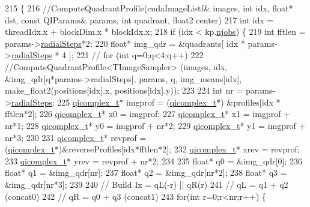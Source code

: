 \begin{DoxyCode}
215 \{
216 \textcolor{comment}{//ComputeQuadrantProfile(cudaImageListf& images, int idx, float* dst, const QIParams& params, int quadrant,
       float2 center)}
217     \textcolor{keywordtype}{int} idx = threadIdx.x + blockDim.x * blockIdx.x;
218     \textcolor{keywordflow}{if} (idx < kp.\hyperlink{struct_base_kernel_params_aec40d44810d0e0a6640c66038af1fbf2}{njobs}) \{
219         \textcolor{keywordtype}{int} fftlen = params->\hyperlink{struct_q_i_params_a19b7d550113364de4e4f11e2c9cfea0e}{radialSteps}*2;
220         \textcolor{keywordtype}{float}* img\_qdr = &quadrants[ idx * params->\hyperlink{struct_q_i_params_a19b7d550113364de4e4f11e2c9cfea0e}{radialSteps} * 4 ];
221     \textcolor{comment}{//  for (int q=0;q<4;q++)}
222             \textcolor{comment}{//ComputeQuadrantProfile<TImageSampler> (images, idx, &img\_qdr[q*params->radialSteps], params,
       q, img\_means[idx], make\_float2(positions[idx].x, positions[idx].y));}
223 
224         \textcolor{keywordtype}{int} nr = params->\hyperlink{struct_q_i_params_a19b7d550113364de4e4f11e2c9cfea0e}{radialSteps};
225         \hyperlink{_q_i_8h_ad57806420787f160bbbe768dbd72d115}{qicomplex\_t}* imgprof = (\hyperlink{_q_i_8h_ad57806420787f160bbbe768dbd72d115}{qicomplex\_t}*) &profiles[idx * fftlen*2];
226         \hyperlink{_q_i_8h_ad57806420787f160bbbe768dbd72d115}{qicomplex\_t}* x0 = imgprof;
227         \hyperlink{_q_i_8h_ad57806420787f160bbbe768dbd72d115}{qicomplex\_t}* x1 = imgprof + nr*1;
228         \hyperlink{_q_i_8h_ad57806420787f160bbbe768dbd72d115}{qicomplex\_t}* y0 = imgprof + nr*2;
229         \hyperlink{_q_i_8h_ad57806420787f160bbbe768dbd72d115}{qicomplex\_t}* y1 = imgprof + nr*3;
230 
231         \hyperlink{_q_i_8h_ad57806420787f160bbbe768dbd72d115}{qicomplex\_t}* revprof = (\hyperlink{_q_i_8h_ad57806420787f160bbbe768dbd72d115}{qicomplex\_t}*)&reverseProfiles[idx*fftlen*2];
232         \hyperlink{_q_i_8h_ad57806420787f160bbbe768dbd72d115}{qicomplex\_t}* xrev = revprof;
233         \hyperlink{_q_i_8h_ad57806420787f160bbbe768dbd72d115}{qicomplex\_t}* yrev = revprof + nr*2;
234 
235         \textcolor{keywordtype}{float}* q0 = &img\_qdr[0];
236         \textcolor{keywordtype}{float}* q1 = &img\_qdr[nr];
237         \textcolor{keywordtype}{float}* q2 = &img\_qdr[nr*2];
238         \textcolor{keywordtype}{float}* q3 = &img\_qdr[nr*3];
239 
240         \textcolor{comment}{// Build Ix = qL(-r) || qR(r)}
241         \textcolor{comment}{// qL = q1 + q2   (concat0)}
242         \textcolor{comment}{// qR = q0 + q3   (concat1)}
243         \textcolor{keywordflow}{for}(\textcolor{keywordtype}{int} r=0;r<nr;r++) \{

\end{DoxyCode}
